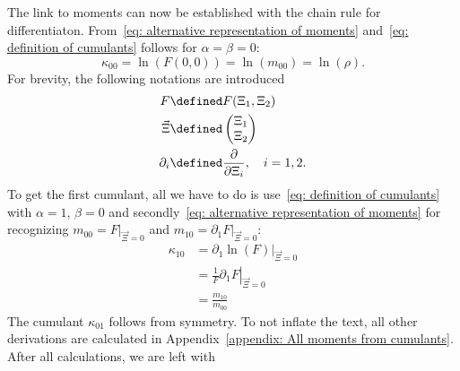 
The link to moments can now be established with the chain rule for differentiaton.
From~\eqref{eq: alternative representation of moments} and~\eqref{eq: definition of cumulants} follows for $\alpha=\beta=0$:
\begin{equation}
  \kappa_{00} = \ln(F(0,0)) = \ln(m_{00}) = \ln(\rho).
\end{equation}
For brevity, the following notations are introduced
\begin{equation}
  \label{eq: abbreviations for deriving cumulants from moments}
  \begin{aligned}
    F & \defined F(\Xi_1, \Xi_2) \\
    \vec{\Xi} &\defined \begin{pmatrix}\Xi_1 \\ \Xi_2  \end{pmatrix} \\
    \partial_i &\defined \frac{\partial}{\partial \Xi_i},\quad i=1,2.
  \end{aligned}
\end{equation}
To get the first cumulant, all we have to do is use~\eqref{eq: definition of cumulants} with $\alpha=1$, $\beta=0$ and secondly~\eqref{eq: alternative representation of moments}
for recognizing $m_{00} = \left. F \right|_{\vec{\Xi} = 0} $ and $m_{10} = \left. \partial_1 F \right|_{\vec{\Xi} = 0}$:
\begin{equation}
  \begin{aligned}
    \kappa_{10} & = \left.\partial_1 \ln(F) \right|_{\vec{\Xi} = 0} \\
    & = \left. \frac{1}{F} \partial_1 F \right|_{\vec{\Xi} = 0} \\
    & = \frac{m_{10}}{m_{00}}
  \end{aligned}
\end{equation}
The cumulant $\kappa_{01}$ follows from symmetry.
To not inflate the text, all other derivations are calculated in Appendix~\ref{appendix: All moments from cumulants}.
After all calculations, we are left with
